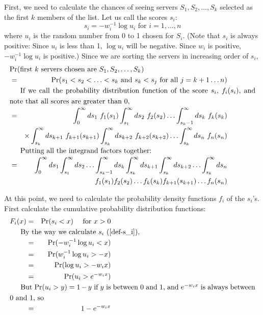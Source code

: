 First, we  need to calculate the chances of seeing
servers $S_1, S_2, \ldots, S_k$
selected as the first $k$ members of the list.
Let us call the scores $s_i$:
\begin{equation}
s_i = \textrm{$- w_i^{-1} \log u_i$ for $i = 1, \ldots, n$} \label{def-s_i}
\end{equation}
where $u_i$ is the random number from 0 to 1 chosen for $S_i$.
(Note that $s_i$ is always positive: 
Since $u_i$ is less than 1, $\log u_i$ will be negative.
Since $w_i$ is positive, $ -w_i^{-1} \log u_i$ is positive.)
Since we are sorting the servers in increasing order of $s_i$,
\begin{eqnarray}
\lefteqn{\Pr{first $k$ servers chosen are $S_1, S_2, \ldots, S_{k}$}} \nonumber \\
&=& \Pr{$s_1 < s_2 < \ldots < s_k$ and $s_k < s_j$ for all $j = k+1
  \ldots n$} \\
\noalign{If we call the probability distribution function of the score $s_i$,
$f_i(s_i)$, and note that all scores are greater than 0,}
&=& \int_0^\infty ds_1 \  f_1(s_1) 
  \int_{s_1}^\infty ds_2 \  f_2(s_2) \ldots
  \int_{s_k-1}^\infty ds_k \  f_k(s_k) \nonumber \\
&& \times \int_{s_k}^\infty ds_{k+1} \  f_{k+1}(s_{k+1})
  \int_{s_k}^\infty ds_{k+2} \  f_{k+2}(s_{k+2}) \ldots
  \int_{s_k}^\infty ds_n \  f_n(s_n) \\
\noalign{Putting all the integrand factors together:}
&=& \int_0^\infty ds_1
  \int_{s_1}^\infty ds_2 \ldots
  \int_{s_k-1}^\infty ds_k 
  \int_{s_k}^\infty ds_{k+1} \int_{s_k}^\infty ds_{k+2} \ldots
  \int_{s_k}^\infty ds_n \nonumber \\
&& f_1(s_1) f_2(s_2) \ldots f_k(s_k) f_{k+1}(s_{k+1}) \ldots f_n(s_n) \label{integrand}
\end{eqnarray}

At this point, we need to calculate the probability density functions
$f_i$ of the $s_i$'s.
First calculate the cumulative probability distribution functions:
\begin{eqnarray}
F_i(x) &=& \Pr{$s_i < x$}  \ \ \ \ \textrm{for $x > 0$} \\
\noalign{By the way we calculate $s_i$ (\ref{def-s_i}),}
&=& \Pr{$- w_i^{-1} \log u_i < x$} \nonumber \\
&=& \Pr{$w_i^{-1} \log u_i > -x$} \nonumber \\
&=& \Pr{$\log u_i > - w_i x $} \nonumber \\
&=& \Pr{$u_i > e^{- w_i x} $} \nonumber \\
\noalign{But $\Pr{$u_i > y$} = 1-y$ if $y$ is between 0 and 1, and
$e^{- w_i x}$ is always between 0 and 1, so}
&=& 1 - e^{- w_i x} \label{cum-pdf}
\end{eqnarray}

